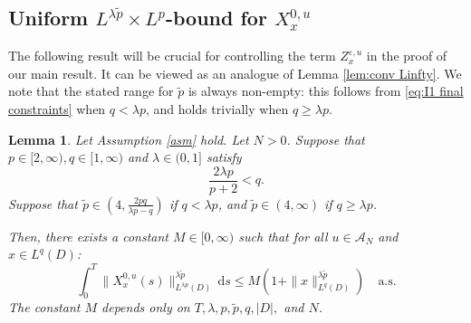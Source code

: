 \documentclass{amsart}
\theoremstyle{plain}
\theoremstyle{remark}
\theoremstyle{plain}
\newtheorem{lemma}[theorem]{Lemma}
\numberwithin{equation}{section}
\newcommand{\eps}{\varepsilon}
\newcommand{\A}{{\mathcal A}}
\newcommand{\dd}{\,\mathrm{d}}
\begin{document}
 
\subsection{Uniform $L^{\lambda\tilde p}\times L^p$-bound for $X_x^{0,u}$}\label{sub:I2} 

The following result will be crucial for controlling the term $Z^{\eps,u}_x$ in the proof of our main result. It can be viewed as an analogue of Lemma \ref{lem:conv Linfty}. 
We note that the stated range for $\tilde p$ is always non-empty: this follows from \eqref{eq:I1 final constraints} when $q<\lambda p$, and holds trivially when $q\geq \lambda p$.


\begin{lemma}\label{lem:I2}
Let Assumption \ref{asm} hold. 
 Let $N>0$. Suppose that $p\in[2,\infty), q\in[1,\infty)$ and $\lambda\in(0,1]$ satisfy 
\begin{equation}\label{eq:I1 final constraints}
\frac{2\lambda p}{p+2}< q.
\end{equation} 
Suppose that $\tilde{p}\in(4,\frac{2pq}{\lambda p-q})$ if $q< \lambda p$, and $\tilde{p}\in(4,\infty)$ if  $q\geq \lambda p$. 

Then, there exists a constant $M\in[0,\infty)$ such that for all $u\in\A_N$ and $x\in L^q(D)$: 
\begin{equation*} 
\int_0^T\|X_x^{0,u}(s)\|_{L^{\lambda p}(D)}^{\lambda\tilde p}\dd s \leq M (1+\|x\|_{L^q(D)}^{\lambda\tilde p})\quad \text{a.s.}
\end{equation*}
The constant $M$ depends only on $T,\lambda,p,\tilde p,q,|D|,$ and $N$.
\end{lemma} 
\end{document}
